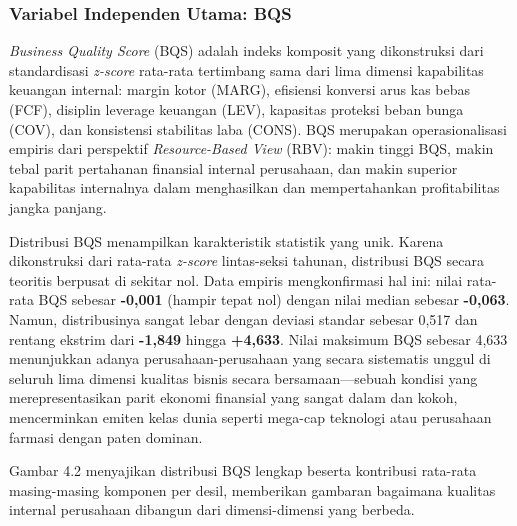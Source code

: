 \documentclass[12pt,a4paper]{article}
\begin{document}
\subsubsection{Variabel Independen Utama:
BQS}\label{variabel-independen-utama-bqs}

\emph{Business Quality Score} (BQS) adalah indeks komposit yang
dikonstruksi dari standardisasi \emph{z-score} rata-rata tertimbang sama
dari lima dimensi kapabilitas keuangan internal: margin kotor (MARG),
efisiensi konversi arus kas bebas (FCF), disiplin leverage keuangan
(LEV), kapasitas proteksi beban bunga (COV), dan konsistensi stabilitas
laba (CONS). BQS merupakan operasionalisasi empiris dari perspektif
\emph{Resource-Based View} (RBV): makin tinggi BQS, makin tebal parit
pertahanan finansial internal perusahaan, dan makin superior kapabilitas
internalnya dalam menghasilkan dan mempertahankan profitabilitas jangka
panjang.

Distribusi BQS menampilkan karakteristik statistik yang unik. Karena
dikonstruksi dari rata-rata \emph{z-score} lintas-seksi tahunan,
distribusi BQS secara teoritis berpusat di sekitar nol. Data empiris
mengkonfirmasi hal ini: nilai rata-rata BQS sebesar \textbf{-0,001}
(hampir tepat nol) dengan nilai median sebesar \textbf{-0,063}. Namun,
distribusinya sangat lebar dengan deviasi standar sebesar 0,517 dan
rentang ekstrim dari \textbf{-1,849} hingga \textbf{+4,633}. Nilai
maksimum BQS sebesar 4,633 menunjukkan adanya perusahaan-perusahaan yang
secara sistematis unggul di seluruh lima dimensi kualitas bisnis secara
bersamaan---sebuah kondisi yang merepresentasikan parit ekonomi
finansial yang sangat dalam dan kokoh, mencerminkan emiten kelas dunia
seperti mega-cap teknologi atau perusahaan farmasi dengan paten dominan.

Gambar 4.2 menyajikan distribusi BQS lengkap beserta kontribusi
rata-rata masing-masing komponen per desil, memberikan gambaran
bagaimana kualitas internal perusahaan dibangun dari dimensi-dimensi
yang berbeda.
\end{document}

